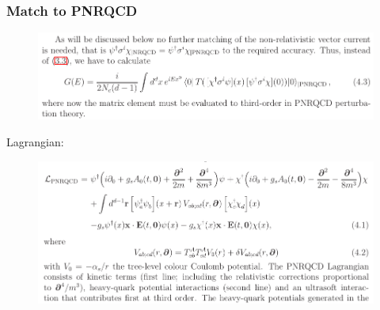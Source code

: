 \documentclass[8pt,dvipsnames,table]{beamer}
\begin{document}
\begin{frame}
	\frametitle{Match to PNRQCD}

	\begin{figure}[!htb]
		\centering
		\includegraphics[width=\linewidth]{image24.png}
		\label{fig:image24}
	\end{figure}

	Lagrangian:
	\begin{figure}[!htb]
		\centering
		\includegraphics[width=\linewidth]{image25.png}
		\label{fig:image25}
	\end{figure}


\end{frame}
\end{document}
